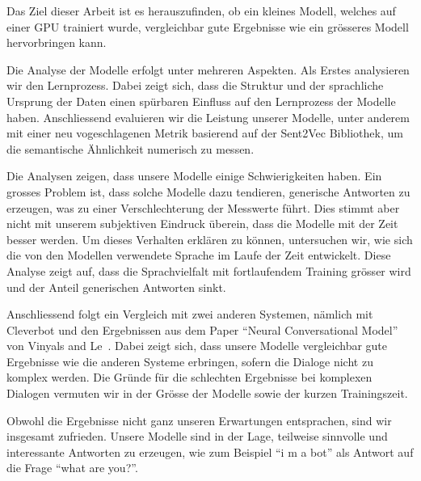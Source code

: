Das Ziel dieser Arbeit ist es herauszufinden, ob ein kleines Modell, welches auf einer GPU trainiert wurde, vergleichbar gute Ergebnisse wie ein grösseres Modell hervorbringen kann.

Die Analyse der Modelle erfolgt unter mehreren Aspekten. Als Erstes analysieren wir den Lernprozess. Dabei zeigt sich, dass die Struktur und der sprachliche Ursprung der Daten einen spürbaren Einfluss auf den Lernprozess der Modelle haben. Anschliessend evaluieren wir die Leistung unserer Modelle, unter anderem mit einer neu vogeschlagenen Metrik basierend auf der Sent2Vec Bibliothek, um die semantische Ähnlichkeit numerisch zu messen.

Die Analysen zeigen, dass unsere Modelle einige Schwierigkeiten haben. Ein grosses Problem ist, dass solche Modelle dazu tendieren, generische Antworten zu erzeugen, was zu einer Verschlechterung der Messwerte führt. Dies stimmt aber nicht mit unserem subjektiven Eindruck überein, dass die Modelle mit der Zeit besser werden. Um dieses Verhalten erklären zu können, untersuchen wir, wie sich die von den Modellen verwendete Sprache im Laufe der Zeit entwickelt. Diese Analyse zeigt auf, dass die Sprachvielfalt mit fortlaufendem Training grösser wird und der Anteil generischen Antworten sinkt.

Anschliessend folgt ein Vergleich mit zwei anderen Systemen, nämlich mit Cleverbot und den Ergebnissen aus dem Paper ``Neural Conversational Model'' von Vinyals and Le~\cite{Vinyals:2015}. Dabei zeigt sich, dass unsere Modelle vergleichbar gute Ergebnisse wie die anderen Systeme erbringen, sofern die Dialoge nicht zu komplex werden. Die Gründe für die schlechten Ergebnisse bei komplexen Dialogen vermuten wir in der Grösse der Modelle sowie der kurzen Trainingszeit.

Obwohl die Ergebnisse nicht ganz unseren Erwartungen entsprachen, sind wir insgesamt zufrieden. Unsere Modelle sind in der Lage, teilweise sinnvolle und interessante Antworten zu erzeugen, wie zum Beispiel ``i m a bot'' als Antwort auf die Frage ``what are you?''.